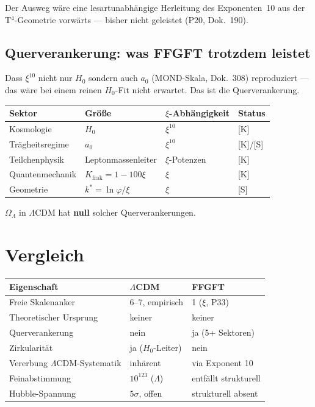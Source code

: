 Der Ausweg wäre eine lesartunabhängige Herleitung des Exponenten~10
aus der T$^4$-Geometrie vorwärts — bisher nicht geleistet (P20, Dok.~190).

\section{Querverankerung: was FFGFT trotzdem leistet}

Dass $\xi^{10}$ nicht nur $H_0$ sondern auch $a_0$ (MOND-Skala,
Dok.~308) reproduziert — das wäre bei einem reinen $H_0$-Fit nicht
erwartet. Das ist die Querverankerung.

\begin{center}
\begin{tabular}{llll}
\toprule
Sektor & Größe & $\xi$-Abhängigkeit & Status \\
\midrule
Kosmologie & $H_0$ & $\xi^{10}$ & [K] \\
Trägheitsregime & $a_0$ & $\xi^{10}$ & [K]/[S] \\
Teilchenphysik & Leptonmassenleiter & $\xi$-Potenzen & [K] \\
Quantenmechanik & $K_\text{frak} = 1-100\xi$ & $\xi$ & [K] \\
Geometrie & $k^* = \ln\varphi/\xi$ & $\xi$ & [S] \\
\bottomrule
\end{tabular}
\end{center}

$\Omega_\Lambda$ in $\Lambda$CDM hat \textbf{null} solcher Querverankerungen.

\chapter{Vergleich}

\begin{center}
\begin{tabular}{lll}
\toprule
Eigenschaft & $\Lambda$CDM & FFGFT \\
\midrule
Freie Skalenanker & 6–7, empirisch & 1 ($\xi$, P33) \\
Theoretischer Ursprung & keiner & keiner \\
Querverankerung & nein & ja (5+ Sektoren) \\
Zirkularität & ja ($H_0$-Leiter) & nein \\
Vererbung $\Lambda$CDM-Systematik & inhärent & via Exponent 10 \\
Feinabstimmung & $10^{123}$ ($\Lambda$) & entfällt strukturell \\
Hubble-Spannung & $5\sigma$, offen & strukturell absent \\
\bottomrule
\end{tabular}
\end{center}


